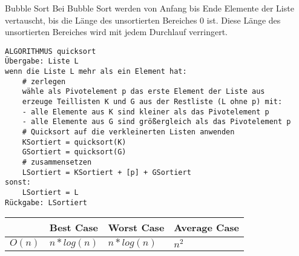 \begin{zitat}{Bubble Sort}
Bei Bubble Sort werden von Anfang bis Ende Elemente der Liste vertauscht, bis die Länge des unsortierten Bereiches 0 ist. Diese Länge des unsortierten Bereiches wird mit jedem Durchlauf verringert.
\end{zitat}
\begin{lstlisting}
ALGORITHMUS quicksort
Übergabe: Liste L
wenn die Liste L mehr als ein Element hat:
    # zerlegen
    wähle als Pivotelement p das erste Element der Liste aus
    erzeuge Teillisten K und G aus der Restliste (L ohne p) mit:
    - alle Elemente aus K sind kleiner als das Pivotelement p
    - alle Elemente aus G sind größergleich als das Pivotelement p
    # Quicksort auf die verkleinerten Listen anwenden
    KSortiert = quicksort(K)
    GSortiert = quicksort(G)
    # zusammensetzen
    LSortiert = KSortiert + [p] + GSortiert
sonst:
    LSortiert = L
Rückgabe: LSortiert
\end{lstlisting}
\begin{table}[h]
\label{tab:my-table}
\begin{tabular}{l|l|l|l|}
\cline{2-4}
                             & Best Case & Worst Case & Average Case \\ \hline
\multicolumn{1}{|l|}{$O(n)$} & $n* log(n)$     & $n * log(n)$      & $n^2$        \\ \hline
\end{tabular}
\end{table}

